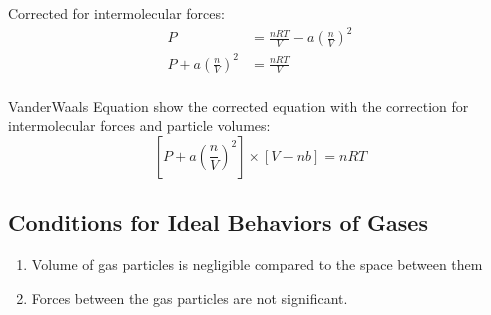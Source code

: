 \documentclass[
	chapter=5,
	title={Gases},
	showanswers=true,
]{chem122notes}
\begin{document}
Corrected for intermolecular forces:
\begin{equation}
	\begin{aligned}
		P &= \frac{nRT}{V} - a\left( \frac{n}{V} \right)^{2}\\
		P + a\left( \frac{n}{V} \right)^{2} &= \frac{nRT}{V}\\
	\end{aligned}
	\label{eq:ideal-gas-behavior-with-intermolecular-forces}
\end{equation}

VanderWaals Equation show the corrected equation with the correction for intermolecular forces and particle volumes:
\begin{equation}
	\left[ P + a\left( \frac{n}{V} \right)^{2} \right] \times \left[ V - nb \right] = nRT
	\label{eq:vanderwaals}
\end{equation}

\subsection{Conditions for Ideal Behaviors of Gases}\label{subsec:conditions-for-ideal-behaviors-of-gases}
\begin{enumerate}
	\item Volume of gas particles is negligible compared to the space between them
	\item Forces between the gas particles are not significant.
\end{enumerate}
\end{document}
